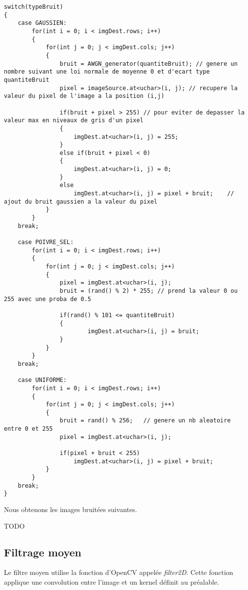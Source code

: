 \documentclass{article}
\begin{document}
 \begin{lstlisting}
switch(typeBruit)
{
    case GAUSSIEN:
        for(int i = 0; i < imgDest.rows; i++)
        {
            for(int j = 0; j < imgDest.cols; j++)
            {
                bruit = AWGN_generator(quantiteBruit); // genere un nombre suivant une loi normale de moyenne 0 et d'ecart type quantiteBruit
                pixel = imageSource.at<uchar>(i, j); // recupere la valeur du pixel de l'image a la position (i,j)

                if(bruit + pixel > 255) // pour eviter de depasser la valeur max en niveaux de gris d'un pixel
                {
                    imgDest.at<uchar>(i, j) = 255;
                }
                else if(bruit + pixel < 0)
                {
                    imgDest.at<uchar>(i, j) = 0;
                }
                else
                    imgDest.at<uchar>(i, j) = pixel + bruit;    // ajout du bruit gaussien a la valeur du pixel
            }
        }
    break;

    case POIVRE_SEL:
        for(int i = 0; i < imgDest.rows; i++)
        {
            for(int j = 0; j < imgDest.cols; j++)
            {
                pixel = imgDest.at<uchar>(i, j);
                bruit = (rand() % 2) * 255; // prend la valeur 0 ou 255 avec une proba de 0.5

                if(rand() % 101 <= quantiteBruit)
                {
                        imgDest.at<uchar>(i, j) = bruit;
                }
            }
        }
    break;

    case UNIFORME:
        for(int i = 0; i < imgDest.rows; i++)
        {
            for(int j = 0; j < imgDest.cols; j++)
            {
                bruit = rand() % 256;   // genere un nb aleatoire entre 0 et 255
                pixel = imgDest.at<uchar>(i, j);

                if(pixel + bruit < 255)
                    imgDest.at<uchar>(i, j) = pixel + bruit;
            }
        }
    break;
}
 \end{lstlisting}

 Nous obtenons les images bruitées suivantes.

 TODO
 
 \subsection{Filtrage moyen}
 Le filtre moyen utilise la fonction d'OpenCV appelée \emph{filter2D}. Cette fonction applique une convolution entre l'image et un kernel définit au préalable.\\
\end{document}

